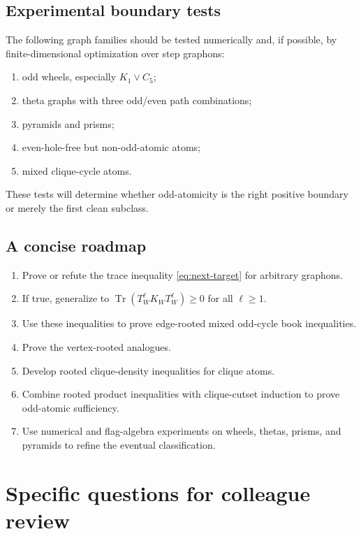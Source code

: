 \documentclass[11pt]{article}
\theoremstyle{definition}
\newcommand{\Tr}{\operatorname{Tr}}
\begin{document}
\subsection{Experimental boundary tests}

The following graph families should be tested numerically and, if possible, by finite-dimensional optimization over step graphons:
\begin{enumerate}[label=(\roman*)]
\item odd wheels, especially $K_1\vee C_5$;
\item theta graphs with three odd/even path combinations;
\item pyramids and prisms;
\item even-hole-free but non-odd-atomic atoms;
\item mixed clique-cycle atoms.
\end{enumerate}
These tests will determine whether odd-atomicity is the right positive boundary or merely the first clean subclass.

\subsection{A concise roadmap}

\begin{enumerate}[label=\textbf{Step \arabic*.},leftmargin=*]
\item Prove or refute the trace inequality \eqref{eq:next-target} for arbitrary graphons.
\item If true, generalize to $\Tr(T_W^\ell K_WT_W^\ell)\ge0$ for all $\ell\ge1$.
\item Use these inequalities to prove edge-rooted mixed odd-cycle book inequalities.
\item Prove the vertex-rooted analogues.
\item Develop rooted clique-density inequalities for clique atoms.
\item Combine rooted product inequalities with clique-cutset induction to prove odd-atomic sufficiency.
\item Use numerical and flag-algebra experiments on wheels, thetas, prisms, and pyramids to refine the eventual classification.
\end{enumerate}


\section{Specific questions for colleague review}
\label{sec:questions-for-colleague}
\end{document}
